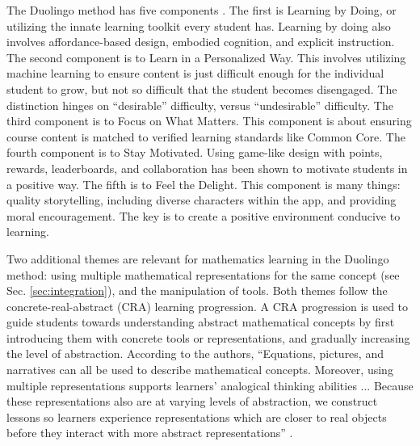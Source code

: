 \documentclass[11pt]{amsart}
\begin{document}
The Duolingo method has five components \cite{duolingo_whitepaper}.  The first is Learning by Doing, or utilizing the innate learning toolkit every student has.  Learning by doing also involves affordance-based design, embodied cognition, and explicit instruction.  The second component is to Learn in a Personalized Way.  This involves utilizing machine learning to ensure content is just difficult enough for the individual student to grow, but not so difficult that the student becomes disengaged.  The distinction hinges on ``desirable'' difficulty, versus ``undesirable'' difficulty.  The third component is to Focus on What Matters.  This component is about ensuring course content is matched to verified learning standards like Common Core.  The fourth component is to Stay Motivated.  Using game-like design with points, rewards, leaderboards, and collaboration has been shown to motivate students in a positive way.  The fifth is to Feel the Delight. This component is many things: quality storytelling, including diverse characters within the app, and providing moral encouragement.  The key is to create a positive environment conducive to learning.  

Two additional themes are relevant for mathematics learning in the Duolingo method: using multiple mathematical representations for the same concept (see Sec. \ref{sec:integration}), and the manipulation of tools.  Both themes follow the concrete-real-abstract (CRA) learning progression.  A CRA progression is used to guide students towards understanding abstract mathematical concepts by first introducing them with concrete tools or representations, and gradually increasing the level of abstraction.  According to the authors, ``Equations, pictures, and narratives can all be used to describe mathematical concepts.  Moreover, using multiple representations supports learners' analogical thinking abilities ... Because these representations also are at varying levels of abstraction, we construct lessons so learners experience representations which are closer to real objects before they interact with more abstract representations'' \cite{duolingo_whitepaper}. 
\end{document}
